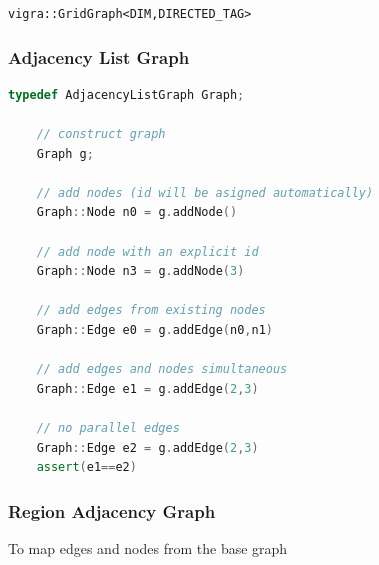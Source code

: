 
    \lstinline{vigra::GridGraph<DIM,DIRECTED_TAG>}

\subsubsection{Adjacency List Graph} \label{sec:graphs_adjacency_list_graph}


    \begin{minipage}{\textwidth}\vspace{-0.75cm}\begin{lstlisting}[language=c++]
    typedef AdjacencyListGraph Graph;

    // construct graph
    Graph g;

    // add nodes (id will be asigned automatically)
    Graph::Node n0 = g.addNode() 

    // add node with an explicit id
    Graph::Node n3 = g.addNode(3)

    // add edges from existing nodes
    Graph::Edge e0 = g.addEdge(n0,n1)

    // add edges and nodes simultaneous 
    Graph::Edge e1 = g.addEdge(2,3)

    // no parallel edges 
    Graph::Edge e2 = g.addEdge(2,3)
    assert(e1==e2)  
    \end{lstlisting}\end{minipage}\vspace{0.5cm}



\subsubsection{Region Adjacency Graph} \label{sec:graphs_rag}








To map edges and nodes from the base graph


